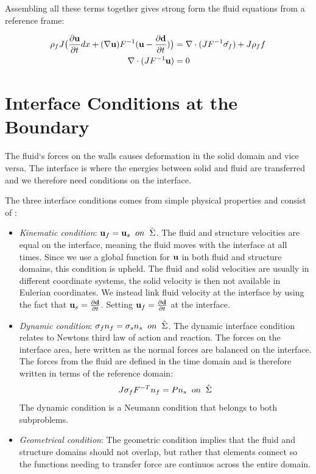 Assembling all these terms together gives strong form the fluid equations from a reference frame:

\begin{align}
\label{eq:NS_mapped}
\rho_f J \big( \frac{\partial \bold{u}}{\partial t} dx + (\nabla \bold{u})F^{-1}(\bold{u}-\frac{\partial \bold{d}}{\partial t}) \big) &= \nabla \cdot( J F^{-1} \hat{\sigma_f} ) + J \rho_f f \\
\nabla \cdot (J F^{-1} \bold{u} ) &= 0
\end{align} 

\section{Interface Conditions at the Boundary}
The fluid`s forces on the walls causes deformation in the solid domain and vice versa. The interface is where the energies between solid and fluid are transferred and we therefore need conditions on the interface. \newline

The three interface conditions comes from simple physical properties and consist of \cite{Richter2010}:
\begin{itemize}
\item \textit{Kinematic condition}: $\bold{u}_f = \bold{u}_s  \hspace{2mm} on \hspace{2mm} \hat{\Sigma}$. The fluid and structure velocities are equal on the interface, meaning the fluid moves with the interface at all times. 
Since we use a global function for $\bold{u}$ in both fluid and structure domains, this condition is upheld.
The fluid and solid velocities are usually in different coordinate systems, the solid velocity is then not available in Eulerian coordinates. We instead link fluid velocity at the interface by using the fact that $\bold{u}_s = \frac{\partial \bold{d}}{\partial t}$. Setting $\bold{u}_f = \frac{\partial \bold{d}}{\partial t}$ at the interface.

\item \textit{Dynamic condition}: $  \sigma_f n_f = \sigma_s n_s \hspace{2mm} on  \hspace{2mm}\hat{\Sigma}   $. 
	The dynamic interface condition relates to Newtons third law of action and reaction. The forces on the interface area, here written as the normal forces are balanced on the interface. The forces from the fluid are defined in the time domain and is therefore written in terms of the reference domain: 
	$$J\sigma_f F^{-T} n_f = P n_s \hspace{2mm} on  \hspace{2mm}\hat{\Sigma} $$
	The dynamic condition is a Neumann condition that belongs to both subproblems.
	
\item \textit{Geometrical condition}: The geometric condition implies that the fluid and structure domains should not overlap, but rather that elements connect so the functions needing to transfer force are continuos across the entire domain.
\end{itemize}


